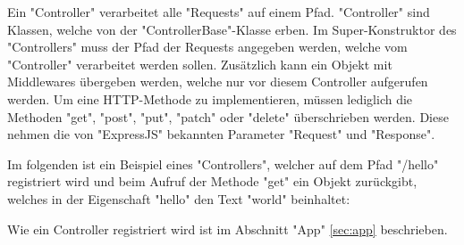 \label{sec:controller}

Ein "Controller" verarbeitet alle "Requests" auf einem Pfad. 
"Controller" sind Klassen, welche von der "ControllerBase"-Klasse erben. 
Im Super-Konstruktor des "Controllers" muss der Pfad der Requests angegeben werden, welche vom "Controller" verarbeitet werden sollen. 
Zusätzlich kann ein Objekt mit Middlewares übergeben werden, welche nur vor diesem Controller aufgerufen werden. 
Um eine HTTP-Methode zu implementieren, müssen lediglich die Methoden "get", "post", "put", "patch" oder "delete" überschrieben werden. 
Diese nehmen die von "ExpressJS" bekannten Parameter "Request" und "Response". 

Im folgenden ist ein Beispiel eines "Controllers", welcher auf dem Pfad "/hello" registriert wird und beim Aufruf der Methode "get" ein Objekt zurückgibt, welches in der Eigenschaft "hello" den Text "world" beinhaltet:


Wie ein Controller registriert wird ist im Abschnitt "App" \ref{sec:app} beschrieben. 